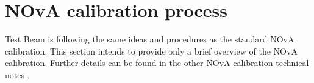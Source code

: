 \documentclass[12pt,a4paper]{article}
\begin{document}


\section{NOvA calibration process}
Test Beam is following the same ideas and procedures as the standard NOvA calibration. This section intends to provide only a brief overview of the NOvA calibration. Further details can be found in the other NOvA calibration technical notes \cite{NOVA-doc-13579}.
\end{document}
